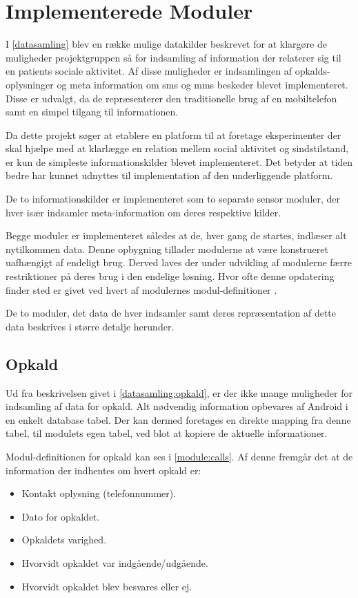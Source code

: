 \section{Implementerede Moduler}
I \cref{datasamling} blev en række mulige datakilder beskrevet for at klargøre de muligheder projektgruppen så for indsamling af information der relaterer sig til en patients sociale aktivitet.
Af disse muligheder er indsamlingen af opkalds-oplysninger og meta information om sms og mms beskeder blevet implementeret.
Disse er udvalgt, da de repræsenterer den traditionelle brug af en mobiltelefon samt en simpel tilgang til informationen.

Da dette projekt søger at etablere en platform til at foretage eksperimenter der skal hjælpe med at klarlægge en relation mellem social aktivitet og sindstilstand, er kun de simpleste informationskilder blevet implementeret.
Det betyder at tiden bedre har kunnet udnyttes til implementation af den underliggende platform.

De to informationskilder er implementeret som to separate sensor moduler, der hver især indsamler meta-information om deres respektive kilder.

Begge moduler er implementeret således at de, hver gang de startes, indlæser alt nytilkommen data.
Denne opbygning tillader modulerne at være konstrueret uafhængigt af endeligt brug.
Derved laves der under udvikling af modulerne færre restriktioner på deres brug i den endelige løsning.
Hvor ofte denne opdatering finder sted er givet ved hvert af modulernes modul-definitioner .

De to moduler, det data de hver indsamler samt deres repræsentation af dette data beskrives i større detalje herunder.

\subsection{Opkald}
Ud fra beskrivelsen givet i \cref{datasamling:opkald}, er der ikke mange muligheder for indsamling af data for opkald.
Alt nødvendig information opbevares af Android i en enkelt database tabel.
Der kan dermed foretages en direkte mapping fra denne tabel, til modulets egen tabel, ved blot at kopiere de aktuelle informationer.

Modul-definitionen for opkald kan ses i \cref{module:calls}.
Af denne fremgår det at de information der indhentes om hvert opkald er:
\begin{itemize}
\item Kontakt oplysning (telefonnummer).
\item Dato for opkaldet.
\item Opkaldets varighed.
\item Hvorvidt opkaldet var indgående/udgående.
\item Hvorvidt opkaldet blev besvares eller ej.
\end{itemize}

